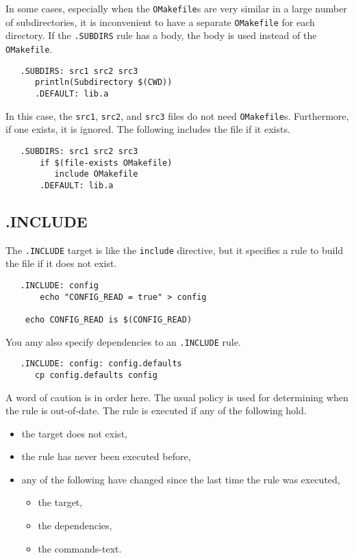 In some cases, especially when the \verb+OMakefile+s are very similar in a large number of
subdirectories, it is inconvenient to have a separate \verb+OMakefile+ for each directory.  If the
\verb+.SUBDIRS+ rule has a body, the body is used instead of the \verb+OMakefile+.

\begin{verbatim}
   .SUBDIRS: src1 src2 src3
      println(Subdirectory $(CWD))
      .DEFAULT: lib.a
\end{verbatim}

In this case, the \verb+src1+, \verb+src2+, and \verb+src3+ files do not need \verb+OMakefile+s.
Furthermore, if one exists, it is ignored.  The following includes the file if it exists.

\begin{verbatim}
   .SUBDIRS: src1 src2 src3
       if $(file-exists OMakefile)
          include OMakefile
       .DEFAULT: lib.a
\end{verbatim}

\subsection{.INCLUDE}

The \verb+.INCLUDE+ target is like the \verb+include+ directive, but it specifies a rule to build
the file if it does not exist.

\begin{verbatim}
   .INCLUDE: config
       echo "CONFIG_READ = true" > config

    echo CONFIG_READ is $(CONFIG_READ)
\end{verbatim}

You amy also specify dependencies to an \verb+.INCLUDE+ rule.

\begin{verbatim}
   .INCLUDE: config: config.defaults
      cp config.defaults config
\end{verbatim}

A word of caution is in order here.  The usual policy is used for determining when the rule is
out-of-date.  The rule is executed if any of the following hold.

\begin{itemize}
\item the target does not exist,
\item the rule has never been executed before,
\item any of the following have changed since the last time the rule was executed,
\begin{itemize}
\item the target,
\item the dependencies,
\item the commands-text.
\end{itemize}
\end{itemize}

